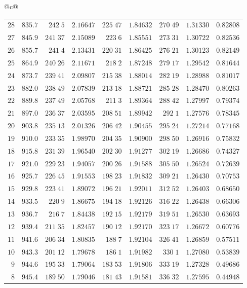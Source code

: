 \begin{center}
{\begin{tabular}{@{}c@{}}
\begin{tabular}{r|r|r|r|r|r|r|r|r}
$28$&$835.7$&$242\;5$&$2.16647$&$225\;47$&$1.84632$&$270\;49$&$1.31330$&$0.82808$\\
$27$&$845.9$&$241\;37$&$2.15089$&$223\;6$&$1.85551$&$273\;31$&$1.30722$&$0.82536$\\
$26$&$855.7$&$241\;4$&$2.13431$&$220\;31$&$1.86425$&$276\;21$&$1.30123$&$0.82149$\\[2pt]
$25$&$864.9$&$240\;26$&$2.11671$&$218\;2$&$1.87248$&$279\;17$&$1.29542$&$0.81644$\\
$24$&$873.7$&$239\;41$&$2.09807$&$215\;38$&$1.88014$&$282\;19$&$1.28988$&$0.81017$\\
$23$&$882.0$&$238\;49$&$2.07839$&$213\;18$&$1.88721$&$285\;28$&$1.28470$&$0.80263$\\
$22$&$889.8$&$237\;49$&$2.05768$&$211\;3$&$1.89364$&$288\;42$&$1.27997$&$0.79374$\\
$21$&$897.0$&$236\;37$&$2.03595$&$208\;51$&$1.89942$&$292\;1$&$1.27576$&$0.78345$\\[2pt]
$20$&$903.8$&$235\;13$&$2.01326$&$206\;42$&$1.90455$&$295\;24$&$1.27214$&$0.77168$\\
$19$&$910.0$&$233\;35$&$1.98970$&$204\;35$&$1.90900$&$298\;50$&$1.26916$&$0.75832$\\
$18$&$915.8$&$231\;39$&$1.96540$&$202\;30$&$1.91277$&$302\;19$&$1.26686$&$0.74327$\\
$17$&$921.0$&$229\;23$&$1.94057$&$200\;26$&$1.91588$&$305\;50$&$1.26524$&$0.72639$\\
$16$&$925.7$&$226\;45$&$1.91553$&$198\;23$&$1.91832$&$309\;21$&$1.26430$&$0.70753$\\[2pt]
$15$&$929.8$&$223\;41$&$1.89072$&$196\;21$&$1.92011$&$312\;52$&$1.26403$&$0.68650$\\
$14$&$933.5$&$220\;9$&$1.86675$&$194\;18$&$1.92126$&$316\;22$&$1.26438$&$0.66306$\\
$13$&$936.7$&$216\;7$&$1.84438$&$192\;15$&$1.92179$&$319\;51$&$1.26530$&$0.63693$\\
$12$&$939.4$&$211\;35$&$1.82457$&$190\;12$&$1.92170$&$323\;17$&$1.26672$&$0.60776$\\
$11$&$941.6$&$206\;34$&$1.80835$&$188\;7$&$1.92104$&$326\;41$&$1.26859$&$0.57511$\\[2pt]
$10$&$943.3$&$201\;12$&$1.79678$&$186\;1$&$1.91982$&$330\;1$&$1.27080$&$0.53839$\\
$9$&$944.6$&$195\;33$&$1.79064$&$183\;53$&$1.91806$&$333\;19$&$1.27328$&$0.49686$\\
$8$&$945.4$&$189\;50$&$1.79046$&$181\;43$&$1.91581$&$336\;32$&$1.27595$&$0.44948$\\

\end{tabular}
\end{tabular}}
\end{center}
